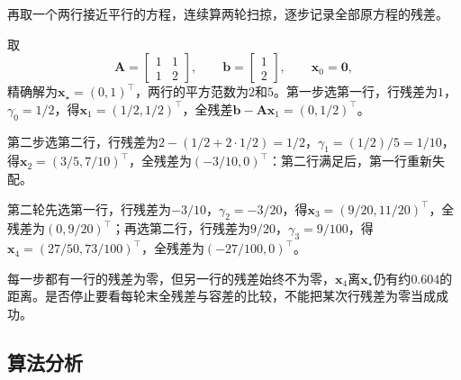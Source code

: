 再取一个两行接近平行的方程，连续算两轮扫掠，逐步记录全部原方程的残差。

\begin{example}[循环Kaczmarz的两轮扫掠]
\label{ex:ls-kaczmarz-two-sweeps}
取
\[
 \bm A=\begin{bmatrix}1&1\\1&2\end{bmatrix},\qquad \bm b=\begin{bmatrix}1\\2\end{bmatrix},\qquad \bm x_0=\bm0,
\]
精确解为$\bm x_\star=(0,1)^\top$，两行的平方范数为$2$和$5$。第一步选第一行，行残差为$1$，$\gamma_0=1/2$，得$\bm x_1=(1/2,1/2)^\top$，全残差$\bm b-\bm A\bm x_1=(0,1/2)^\top$。

第二步选第二行，行残差为$2-(1/2+2\cdot1/2)=1/2$，$\gamma_1=(1/2)/5=1/10$，得$\bm x_2=(3/5,7/10)^\top$，全残差为$(-3/10,0)^\top$：第二行满足后，第一行重新失配。

第二轮先选第一行，行残差为$-3/10$，$\gamma_2=-3/20$，得$\bm x_3=(9/20,11/20)^\top$，全残差为$(0,9/20)^\top$；再选第二行，行残差为$9/20$，$\gamma_3=9/100$，得$\bm x_4=(27/50,73/100)^\top$，全残差为$(-27/100,0)^\top$。

每一步都有一行的残差为零，但另一行的残差始终不为零，$\bm x_4$离$\bm x_\star$仍有约$0.604$的距离。是否停止要看每轮末全残差与容差的比较，不能把某次行残差为零当成成功。
\end{example}

\subsection{算法分析}

